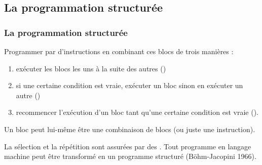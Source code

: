 \documentclass[xcolor=svgnames]{beamer}
\begin{document}
\subsection{La programmation structurée}
\begin{frame}
  \frametitle{La programmation structurée}

  \begin{definition}
    Programmer par  d'instructions en combinant ces blocs de trois manières :\pause
    \begin{enumerate}
    \item exécuter les blocs les uns à la suite des autres ()\pause
    \item si une certaine condition est vraie, exécuter un bloc sinon
      en exécuter un autre ()\pause
    \item recommencer l'exécution d'un bloc tant qu'une certaine
      condition est vraie ().\pause
    \end{enumerate}
    Un bloc peut lui-même être une combinaison de blocs (ou juste une instruction).
  \end{definition}
\pause La sélection et la répétition sont assurées par des
.
  \pause Tout programme en langage machine peut
  être transformé en un programme structuré (Böhm-Jacopini 1966).
\end{frame}
\end{document}
